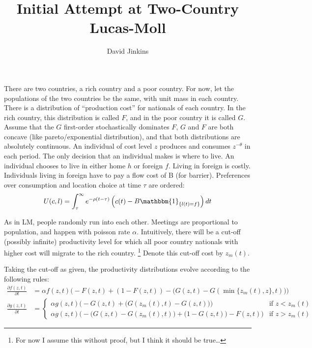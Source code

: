 \documentclass{article}
\title{Initial Attempt at Two-Country Lucas-Moll}
\author{David Jinkins}
\begin{document}
\maketitle

There are two countries, a rich country and a poor country.  
For now, let the populations of the two countries be the same, with unit mass in each country.
There is a distribution of ``production cost'' for nationals of each country.
In the rich country, this distribution is called $F$, and in the poor country it is called $G$.  
Assume that the $G$ first-order stochastically dominates $F$, $G$ and $F$ are both concave (like pareto/exponential distribution), and that both distributions are absolutely continuous.
An individual of cost level $z$ produces and consumes $z^{-\theta}$ in each period.
The only decision that an individual makes is where to live.
An individual chooses to live in either home $h$ or foreign $f$.
Living in foreign is costly.
Individuals living in foreign have to pay a flow cost of B (for barrier).
Preferences over consumption and location choice at time $\tau$ are ordered:
\begin{equation}
  U(c,l) = \int_\tau^\infty e^{-\rho (t-\tau)} \left(c(t) - B \mathbbm{1}_{\{l(t) = f\}} \right) dt  
\end{equation}

As in LM, people randomly run into each other.  
Meetings are proportional to population, and happen with poisson rate $\alpha$.  
Intuitively, there will be a cut-off (possibly infinite) productivity level for which all poor country nationals with higher cost will migrate to the rich country. 
\footnote{For now I assume this without proof, but I think it should be true\dots}
Denote this cut-off cost by $z_m(t)$.

Taking the cut-off as given, the productivity distributions evolve according to the following rules:
\begin{align}
  \frac{\partial f(z,t)}{\partial t} &= \alpha f(z,t) \Big( -F(z,t) + \left(1-F(z,t)\right) - \big(G(z,t) - G(\min\{z_m(t),z\},t) \big) \Big) \\
  \frac{\partial g(z,t)}{\partial t} &= 
  \begin{cases} 
    \alpha g(z,t) \Big( -G(z,t) + \big(G(z_m(t),t) - G(z,t) \big) \Big) & \mbox{if } z<z_m(t) \\
    \alpha g(z,t) \Big( -\big(G(z,t)-G(z_m(t),t)\big) + \big(1-G(z,t)\big) - F(z,t) \Big) &\mbox{if } z>z_m(t)
  \end{cases}
\end{align}
\end{document}
